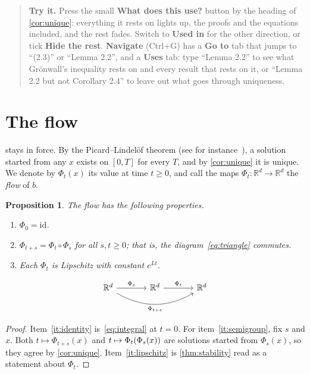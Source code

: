 \documentclass{amsart}
\newtheorem{proposition}[theorem]{Proposition}
\theoremstyle{definition}
\theoremstyle{remark}
\numberwithin{equation}{section}
\newenvironment{tryit}{\begin{quote}\small\textbf{Try it.}}{\end{quote}}
\newcommand{\R}{\mathbb{R}}
\newcommand{\Id}{\mathrm{id}}
\begin{document}
\begin{tgonly}
\begin{tryit}
Press the small \textbf{What does this use?} button by the heading of
\cref{cor:unique}: everything it rests on lights up, the proofs and the
equations included, and the rest fades. Switch to \textbf{Used in} for the
other direction, or tick \textbf{Hide the rest}. \textbf{Navigate}
(Ctrl+G) has a \textbf{Go to} tab that jumps to ``(2.3)'' or ``Lemma 2.2'',
and a \textbf{Uses} tab: type ``Lemma 2.2'' to see what Gr\"onwall's
inequality rests on and every result that rests on it, or ``Lemma 2.2 but not
Corollary 2.4'' to leave out what goes through uniqueness.
\end{tryit}
\end{tgonly}

\section{The flow}\label{sec:flow}

 stays in force. By the Picard--Lindel\"of theorem (see for
instance~\cite{hartman}), a solution started from any $x$ exists on $[0, T]$
for every $T$, and by \cref{cor:unique} it is unique. We denote by
$\Phi_t(x)$ its value at time $t \ge 0$, and call the maps
$\Phi_t \colon \R^d \to \R^d$ the \emph{flow} of $b$.

\begin{proposition}\label{prop:flow}
The flow has the following properties.
\begin{enumerate}[label=(\roman*)]
  \item\label{it:identity} $\Phi_0 = \Id$.
  \item\label{it:semigroup} $\Phi_{t+s} = \Phi_t \circ \Phi_s$ for all
    $s, t \ge 0$; that is, the diagram~\eqref{eq:triangle} commutes.
  \item\label{it:lipschitz} Each $\Phi_t$ is Lipschitz with constant
    $e^{Lt}$.
\end{enumerate}
\begin{equation}\label{eq:triangle}
\begin{tikzcd}[column sep=large]
  \R^d \arrow[r, "\Phi_s"] \arrow[rr, bend right=30, "\Phi_{t+s}"'] & \R^d \arrow[r, "\Phi_t"] & \R^d
\end{tikzcd}
\end{equation}
\end{proposition}

\begin{proof}
Item~\ref{it:identity} is~\eqref{eq:integral} at $t = 0$. For
item~\ref{it:semigroup}, fix $s$ and $x$. Both
$t \mapsto \Phi_{t+s}(x)$ and $t \mapsto \Phi_t\qty(\Phi_s(x))$ are solutions
started from $\Phi_s(x)$, so they agree by \cref{cor:unique}.
Item~\ref{it:lipschitz} is \cref{thm:stability} read as a statement about
$\Phi_t$.
\end{proof}
\end{document}
